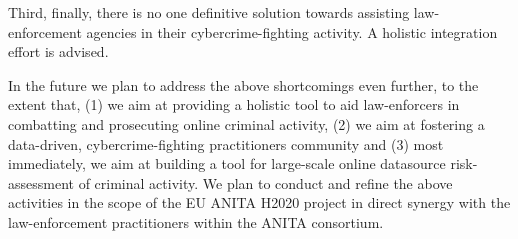 Third, finally, there is no one definitive solution towards assisting law-enforcement agencies in their cybercrime-fighting activity. A holistic integration effort is advised.



In the future we plan to address the above shortcomings even further, to the extent that, (1) we aim at providing a holistic tool to aid law-enforcers in combatting and prosecuting online criminal activity, (2) we aim at fostering a data-driven, cybercrime-fighting practitioners community and (3) most immediately, we aim at building a tool for large-scale online datasource risk-assessment of criminal activity. We plan to conduct and refine the above activities in the scope of the EU ANITA H2020 project in direct synergy with the law-enforcement practitioners within the ANITA consortium.